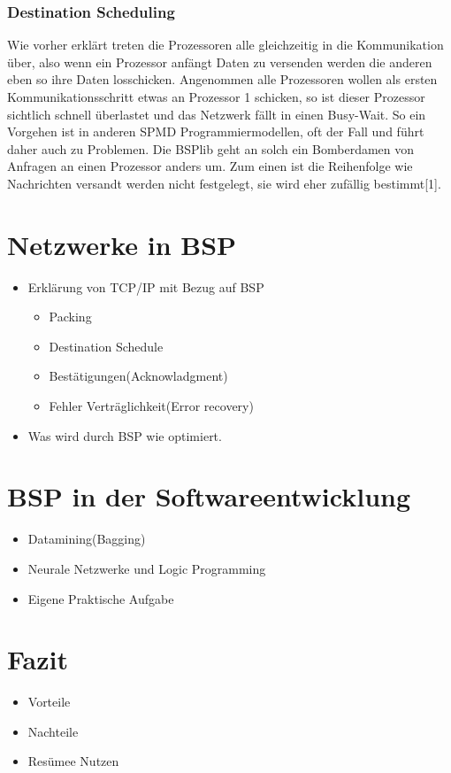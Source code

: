 \documentclass[a4paper,10pt]{scrartcl}
\begin{document}
\subsubsection{Destination Scheduling}
Wie vorher erklärt treten die Prozessoren alle gleichzeitig in die Kommunikation über, also wenn ein Prozessor anfängt Daten zu versenden werden die anderen eben so ihre Daten losschicken. Angenommen alle Prozessoren wollen als ersten Kommunikationsschritt etwas an Prozessor 1 schicken, so ist dieser Prozessor sichtlich schnell überlastet und das Netzwerk fällt in einen Busy-Wait. So ein Vorgehen ist in anderen SPMD Programmiermodellen, oft der Fall und führt daher auch zu Problemen. Die BSPlib geht an solch ein Bomberdamen von Anfragen an einen Prozessor anders um. Zum einen ist die Reihenfolge wie Nachrichten versandt werden nicht festgelegt, sie wird eher zufällig bestimmt[1].

\section{Netzwerke in BSP}
\begin{itemize}
\item Erklärung von TCP/IP mit Bezug auf BSP
\begin{itemize}
\item Packing
\item Destination Schedule
\item Bestätigungen(Acknowladgment)
\item Fehler Verträglichkeit(Error recovery)
\end{itemize}
\item Was wird durch BSP wie optimiert.

\end{itemize}
\section{BSP in der Softwareentwicklung}
\begin{itemize}
\item Datamining(Bagging)
\item Neurale Netzwerke und Logic Programming
\item Eigene Praktische Aufgabe
\end{itemize}
\section{Fazit}
\begin{itemize}
 \item Vorteile
 \item Nachteile
 \item Resümee Nutzen
\end{itemize}
\end{document}
